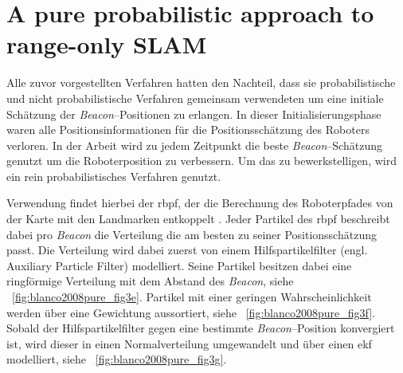 \begin{comment}
------------------------------------------------------------------------------------------
-\cite{smith2004tracking}
	- Tracking moving devices with the cricket location system (547)
\end{comment}


\begin{comment}
------------------------------------------------------------------------------------------
\end{comment}
\section{A pure probabilistic approach to range-only SLAM}\label{sec:blanco2008pure}

Alle zuvor vorgestellten Verfahren hatten den Nachteil, dass sie probabilistische und nicht probabilistische Verfahren gemeinsam verwendeten um eine initiale Schätzung der \textit{Beacon}--Positionen zu erlangen. In dieser Initialisierungsphase waren alle Positionsinformationen für die Positionsschätzung des Roboters verloren. In der Arbeit  \cite{blanco2008pure} wird zu jedem Zeitpunkt die beste \textit{Beacon}--Schätzung genutzt um die Roboterposition zu verbessern. Um das zu bewerkstelligen, wird ein rein probabilistisches Verfahren genutzt.

Verwendung findet hierbei der \Gls{rbpf}, der die Berechnung des Roboterpfades von der Karte mit den Landmarken entkoppelt \cite{murphy2001rao, montemerlo2002fastslam}. Jeder Partikel des \Gls{rbpf} beschreibt dabei pro \textit{Beacon} die Verteilung die am besten zu seiner Positionsschätzung passt. Die Verteilung wird dabei zuerst von einem Hilfspartikelfilter (engl. Auxiliary Particle Filter) modelliert. Seine Partikel besitzen dabei eine ringförmige Verteilung mit dem Abstand des \textit{Beacon}, siehe \figurename~\ref{fig:blanco2008pure_fig3e}. Partikel mit einer geringen Wahrscheinlichkeit werden über eine Gewichtung aussortiert, siehe \figurename~\ref{fig:blanco2008pure_fig3f}. Sobald der Hilfspartikelfilter gegen eine bestimmte \textit{Beacon}--Position konvergiert ist, wird dieser in einen Normalverteilung umgewandelt und über einen \Gls{ekf} modelliert, siehe \figurename~\ref{fig:blanco2008pure_fig3g}.

